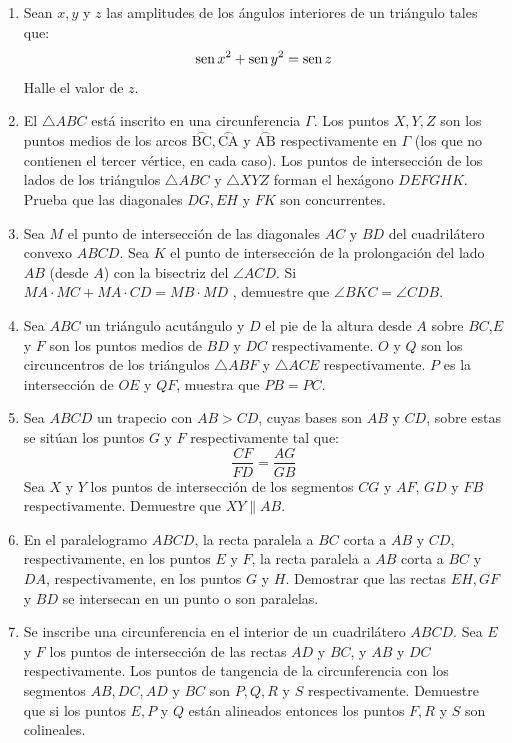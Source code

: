 \documentclass{book}
\newcommand{\sen}{\mathop{\rm sen}\nolimits} %
\begin{document}
\begin{enumerate}
    \item Sean $x,y$ y $z$ las amplitudes de los ángulos interiores de un triángulo tales que:
          $$\sen{x^2}+\sen{y^2}=\sen{z}$$
          Halle el valor de $z$.
    \item El $\triangle ABC$ está inscrito en una circunferencia $\Gamma$. Los puntos $X,Y,Z$ son los puntos medios de los arcos $\stackrel{\textstyle\frown}{\mathrm{BC}},\stackrel{\textstyle\frown}{\mathrm{CA}}$ y  $\stackrel{\textstyle\frown}{\mathrm{AB}}$ respectivamente en $\Gamma$ (los que no contienen el tercer vértice, en cada caso). Los puntos de intersección de los lados de los triángulos $\triangle ABC$ y $\triangle XYZ$ forman el hexágono $DEFGHK$. Prueba que las diagonales $DG,EH$ y $FK$ son concurrentes.
    \item Sea $M$ el punto de intersección de las diagonales $AC$ y $BD$ del cuadrilátero convexo $ABCD$. Sea $K$ el punto de intersección de la prolongación del lado $AB$ (desde $A$) con la bisectriz del $\angle ACD$. Si $MA\cdot MC + MA\cdot CD =MB \cdot MD$ , demuestre que $\angle BKC = \angle CDB$.
    \item Sea $ABC$ un triángulo acutángulo y $D$ el pie de la altura desde $A$ sobre $BC$,$E$ y $F$ son los puntos medios de $BD$ y $DC$ respectivamente. $O$ y $Q$ son los circuncentros de los triángulos $\triangle ABF$ y $\triangle ACE$ respectivamente. $P$ es la intersección de $OE$ y $QF$, muestra que $PB=PC$.
    \item Sea $ABCD$ un trapecio con $AB > CD$, cuyas bases son $AB$ y $CD$, sobre estas se sitúan los puntos $G$ y $F$ respectivamente tal que:
          $$\frac{CF}{FD}=\frac{AG}{GB}$$
          Sea $X$ y $Y$ los puntos de intersección de los segmentos $CG$ y $AF$, $GD$ y $FB$ respectivamente. Demuestre que $XY \parallel AB$.
    \item En el paralelogramo $ABCD$, la recta paralela a $BC$ corta a $AB$ y $CD$, respectivamente, en los puntos $E$ y $F$, la recta paralela a $AB$ corta a $BC$ y $DA$, respectivamente, en los puntos $G$ y $H$. Demostrar que las rectas $EH,GF$ y $BD$ se intersecan en un punto o son paralelas.
    \item Se inscribe una circunferencia en el interior de un cuadrilátero $ABCD$. Sea $E$ y $F$ los puntos de intersección de las rectas $AD$ y $BC$, y $AB$ y $DC$ respectivamente. Los puntos de tangencia de la circunferencia con los segmentos $AB,DC,AD$ y $BC$ son $P,Q,R$ y $S$ respectivamente. Demuestre que si los puntos $E,P$ y $Q$ están alineados entonces los puntos $F,R$ y $S$ son colineales.

\end{enumerate}
\end{document}
